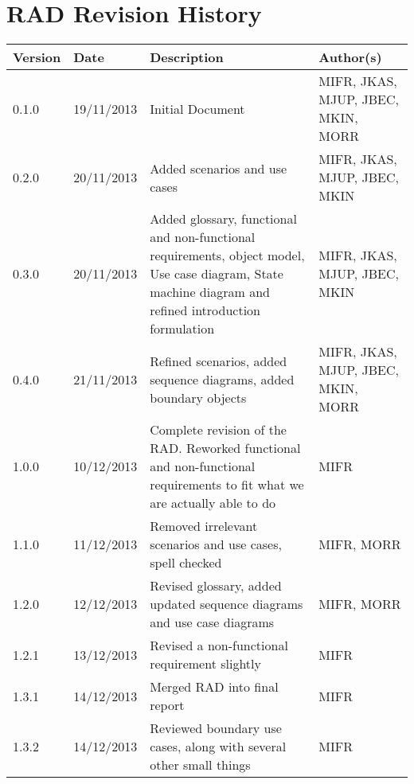 \section{RAD Revision History}
\begin{center}
    \begin{tabular}{ | l | l | p{6cm} | p{4cm} |}
    \hline
    Version & Date & Description & Author(s) \\ \hline
    0.1.0 & 19/11/2013 & Initial Document & MIFR, JKAS, MJUP, JBEC, MKIN, MORR
    \\ \hline
    0.2.0 & 20/11/2013 & Added scenarios and use cases & MIFR, JKAS, MJUP, JBEC, MKIN
    \\ \hline
    0.3.0 & 20/11/2013 & Added glossary, functional and non-functional requirements, object model, Use case diagram, State machine diagram and refined introduction formulation & MIFR, JKAS, MJUP, JBEC, MKIN
    \\ \hline
    0.4.0 & 21/11/2013 & Refined scenarios, added sequence diagrams, added boundary objects & MIFR, JKAS, MJUP, JBEC, MKIN, MORR
    \\ \hline
    1.0.0 & 10/12/2013 & Complete revision of the RAD. Reworked functional and non-functional requirements to fit what we are actually able to do & MIFR
    \\ \hline
    1.1.0 & 11/12/2013 & Removed irrelevant scenarios and use cases, spell checked & MIFR, MORR
    \\ \hline
    1.2.0 & 12/12/2013 & Revised glossary, added updated sequence diagrams and use case diagrams & MIFR, MORR
    \\ \hline
    1.2.1 & 13/12/2013 & Revised a non-functional requirement slightly & MIFR
    \\ \hline
    1.3.1 & 14/12/2013 & Merged RAD into final report & MIFR
    \\ \hline
    1.3.2 & 14/12/2013 & Reviewed boundary use cases, along with several other small things & MIFR
    \\ \hline
    \end{tabular}
\end{center}

